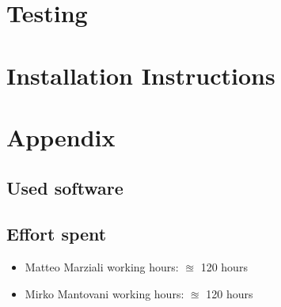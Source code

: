 \documentclass{article}
\begin{document}
\clearpage
\section{Testing}


\clearpage
\section{Installation Instructions}




\clearpage
\section{Appendix}

\subsection{Used software}


\subsection{Effort spent}
\begin{itemize}

\item Matteo Marziali working hours:  $\approxeq$ 120 hours

\item Mirko Mantovani working hours:  $\approxeq$ 120 hours



\end{itemize}
\end{document}
